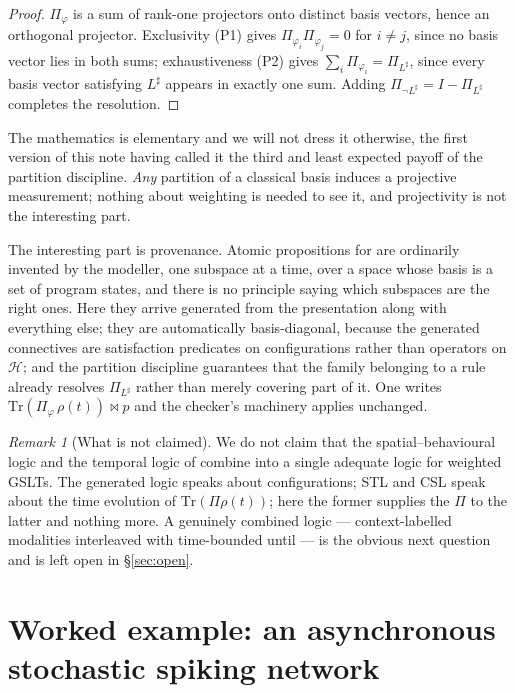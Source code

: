 \documentclass[11pt,a4paper]{article}
\theoremstyle{plain}
\theoremstyle{definition}
\theoremstyle{remark}
\newtheorem{remark}[theorem]{Remark}
\begin{document}
\begin{proof}
$\Pi_\varphi$ is a sum of rank-one projectors onto distinct basis vectors, hence an orthogonal
projector. Exclusivity (P1) gives $\Pi_{\varphi_i}\Pi_{\varphi_j} = 0$ for $i \neq j$, since no basis
vector lies in both sums; exhaustiveness (P2) gives $\sum_i \Pi_{\varphi_i} = \Pi_{L^\sharp}$, since
every basis vector satisfying $L^\sharp$ appears in exactly one sum. Adding
$\Pi_{\neg L^\sharp} = I - \Pi_{L^\sharp}$ completes the resolution.
\end{proof}

The mathematics is elementary and we will not dress it otherwise, the first version of this note
having called it the third and least expected payoff of the partition discipline. \emph{Any}
partition of a classical basis induces a projective measurement; nothing about weighting is needed to
see it, and projectivity is not the interesting part.

The interesting part is provenance. Atomic propositions for \cite{qctmc,qctmc-csl} are ordinarily
invented by the modeller, one subspace at a time, over a space whose basis is a set of program
states, and there is no principle saying which subspaces are the right ones. Here they arrive
generated from the presentation along with everything else; they are automatically basis-diagonal,
because the generated connectives are satisfaction predicates on configurations rather than operators
on $\mathcal{H}$; and the partition discipline guarantees that the family belonging to a rule already
resolves $\Pi_{L^\sharp}$ rather than merely covering part of it. One writes
$\mathrm{Tr}(\Pi_\varphi\,\rho(t)) \bowtie p$ and the checker's machinery applies unchanged.

\begin{remark}[What is not claimed]
We do not claim that the spatial--behavioural logic and the temporal logic of \cite{qctmc} combine
into a single adequate logic for weighted GSLTs. The generated logic speaks about configurations;
STL and CSL speak about the time evolution of $\mathrm{Tr}(\Pi\rho(t))$; here the former supplies the
$\Pi$ to the latter and nothing more. A genuinely combined logic --- context-labelled modalities
interleaved with time-bounded until --- is the obvious next question and is left open in
\S\ref{sec:open}.
\end{remark}

\section{Worked example: an asynchronous stochastic spiking network}
\label{sec:rnn}
\end{document}
